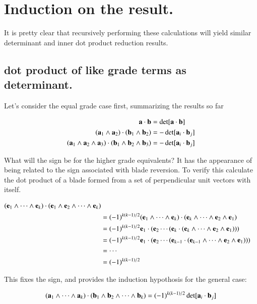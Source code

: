 \documentclass{article}      %
\begin{document}
\section{ Induction on the result. }

It is pretty clear that recursively performing these calculations will yield similar determinant and inner dot product reduction
results.

\subsection{ dot product of like grade terms as determinant. }

Let's consider the equal grade case first, summarizing the results so far

\begin{align*}
\mathbf{a} \cdot \mathbf{b} &= \det[\mathbf{a} \cdot \mathbf{b}] \\
(\mathbf{a}_1 \wedge \mathbf{a}_2) \cdot (\mathbf{b}_1 \wedge \mathbf{b}_2) &= -\det[\mathbf{a}_i \cdot \mathbf{b}_j] \\
(\mathbf{a}_1 \wedge \mathbf{a}_2 \wedge \mathbf{a}_3) \cdot (\mathbf{b}_1 \wedge \mathbf{b}_2 \wedge \mathbf{b}_3) &= -\det[\mathbf{a}_i \cdot \mathbf{b}_j] \\
\end{align*}

What will the sign be for the higher grade equivalents?  It has the appearance of being related to the sign associated with blade
reversion.  To verify this calculate the dot product of a blade formed from a set of perpendicular unit vectors with itself.

\begin{align*}
(\mathbf{e}_1 \wedge \cdots \wedge \mathbf{e}_k) \cdot (\mathbf{e}_1 \wedge \mathbf{e}_2 \wedge \cdots \wedge \mathbf{e}_k) \\
&= (-1)^{k(k-1)/2}(\mathbf{e}_1 \wedge \cdots \wedge \mathbf{e}_k) \cdot (\mathbf{e}_k \wedge \cdots \wedge \mathbf{e}_2 \wedge \mathbf{e}_1) \\
&= (-1)^{k(k-1)/2}\mathbf{e}_1 \cdot (\mathbf{e}_2 \cdots (\mathbf{e}_k \cdot (\mathbf{e}_k \wedge \cdots \wedge \mathbf{e}_2 \wedge \mathbf{e}_1))) \\
&= (-1)^{k(k-1)/2}\mathbf{e}_1 \cdot (\mathbf{e}_2 \cdots (\mathbf{e}_{k-1} \cdot (\mathbf{e}_{k-1} \wedge \cdots \wedge \mathbf{e}_2 \wedge \mathbf{e}_1))) \\
&= \cdots \\
&= (-1)^{k(k-1)/2}
\end{align*}

This fixes the sign, and provides the induction hypothosis for the general case:

\begin{equation}\label{eqn:bladedothyp}
(\mathbf{a}_1 \wedge \cdots \wedge \mathbf{a}_k) \cdot (\mathbf{b}_1 \wedge \mathbf{b}_2 \wedge \cdots \wedge \mathbf{b}_k) = (-1)^{k(k-1)/2}\det[\mathbf{a}_i \cdot \mathbf{b}_j]
\end{equation}
\end{document}
